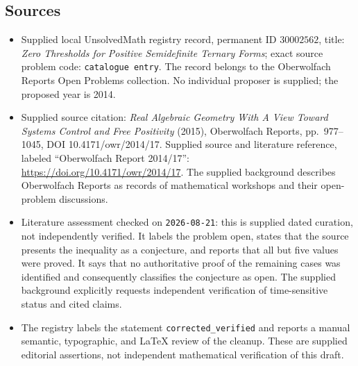 \documentclass[11pt]{article}
\begin{document}
\subsection{Sources}
\begin{itemize}
\item Supplied local UnsolvedMath registry record, permanent ID \(30002562\), title: \emph{Zero Thresholds for Positive Semidefinite Ternary Forms}; exact source problem code: \texttt{catalogue entry}. The record belongs to the Oberwolfach Reports Open Problems collection. No individual proposer is supplied; the proposed year is 2014.
\item Supplied source citation: \emph{Real Algebraic Geometry With A View Toward Systems Control and Free Positivity} (2015), Oberwolfach Reports, pp.\ 977--1045, DOI 10.4171/owr/2014/17. Supplied source and literature reference, labeled ``Oberwolfach Report 2014/17'': \url{https://doi.org/10.4171/owr/2014/17}. The supplied background describes Oberwolfach Reports as records of mathematical workshops and their open-problem discussions.
\item Literature assessment checked on \texttt{2026-08-21}: this is supplied dated curation, not independently verified. It labels the problem open, states that the source presents the inequality as a conjecture, and reports that all but five values were proved. It says that no authoritative proof of the remaining cases was identified and consequently classifies the conjecture as open. The supplied background explicitly requests independent verification of time-sensitive status and cited claims.
\item The registry labels the statement \texttt{corrected\_verified} and reports a manual semantic, typographic, and LaTeX review of the cleanup. These are supplied editorial assertions, not independent mathematical verification of this draft.
\end{itemize}
\end{document}
